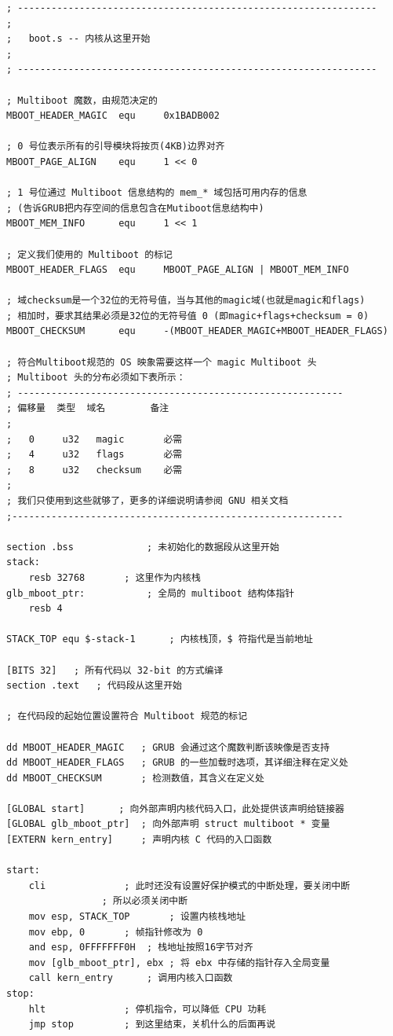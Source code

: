 \begin{lstlisting}[language = {[x86masm]Assembler}, caption = boot/boot.s]
; ----------------------------------------------------------------
;
; 	boot.s -- 内核从这里开始
;
; ----------------------------------------------------------------

; Multiboot 魔数，由规范决定的
MBOOT_HEADER_MAGIC 	equ 	0x1BADB002

; 0 号位表示所有的引导模块将按页(4KB)边界对齐
MBOOT_PAGE_ALIGN 	equ 	1 << 0

; 1 号位通过 Multiboot 信息结构的 mem_* 域包括可用内存的信息
; (告诉GRUB把内存空间的信息包含在Mutiboot信息结构中)
MBOOT_MEM_INFO 		equ 	1 << 1    

; 定义我们使用的 Multiboot 的标记
MBOOT_HEADER_FLAGS 	equ 	MBOOT_PAGE_ALIGN | MBOOT_MEM_INFO

; 域checksum是一个32位的无符号值，当与其他的magic域(也就是magic和flags)
; 相加时，要求其结果必须是32位的无符号值 0 (即magic+flags+checksum = 0)
MBOOT_CHECKSUM 		equ 	-(MBOOT_HEADER_MAGIC+MBOOT_HEADER_FLAGS)

; 符合Multiboot规范的 OS 映象需要这样一个 magic Multiboot 头
; Multiboot 头的分布必须如下表所示：
; ----------------------------------------------------------
; 偏移量  类型  域名        备注
;
;   0     u32   magic       必需
;   4     u32   flags       必需 
;   8     u32   checksum    必需 
;
; 我们只使用到这些就够了，更多的详细说明请参阅 GNU 相关文档
;-----------------------------------------------------------

section .bss 			 ; 未初始化的数据段从这里开始
stack:
	resb 32768 	 	 ; 这里作为内核栈
glb_mboot_ptr: 			 ; 全局的 multiboot 结构体指针
	resb 4

STACK_TOP equ $-stack-1 	 ; 内核栈顶，$ 符指代是当前地址

[BITS 32]  	; 所有代码以 32-bit 的方式编译
section .text 	; 代码段从这里开始

; 在代码段的起始位置设置符合 Multiboot 规范的标记

dd MBOOT_HEADER_MAGIC 	; GRUB 会通过这个魔数判断该映像是否支持
dd MBOOT_HEADER_FLAGS   ; GRUB 的一些加载时选项，其详细注释在定义处
dd MBOOT_CHECKSUM       ; 检测数值，其含义在定义处

[GLOBAL start] 		; 向外部声明内核代码入口，此处提供该声明给链接器
[GLOBAL glb_mboot_ptr] 	; 向外部声明 struct multiboot * 变量
[EXTERN kern_entry] 	; 声明内核 C 代码的入口函数

start:
	cli  			 ; 此时还没有设置好保护模式的中断处理，要关闭中断
				 ; 所以必须关闭中断
	mov esp, STACK_TOP  	 ; 设置内核栈地址
	mov ebp, 0 		 ; 帧指针修改为 0
	and esp, 0FFFFFFF0H	 ; 栈地址按照16字节对齐
	mov [glb_mboot_ptr], ebx ; 将 ebx 中存储的指针存入全局变量
	call kern_entry		 ; 调用内核入口函数
stop:
	hlt 			 ; 停机指令，可以降低 CPU 功耗
	jmp stop 		 ; 到这里结束，关机什么的后面再说
\end{lstlisting} 

